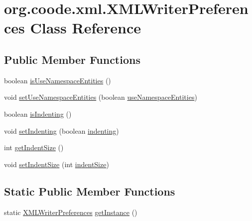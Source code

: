 \hypertarget{classorg_1_1coode_1_1xml_1_1_x_m_l_writer_preferences}{\section{org.\-coode.\-xml.\-X\-M\-L\-Writer\-Preferences Class Reference}
\label{classorg_1_1coode_1_1xml_1_1_x_m_l_writer_preferences}
}
\subsection*{Public Member Functions}
\begin{DoxyCompactItemize}
\item 
boolean \hyperlink{classorg_1_1coode_1_1xml_1_1_x_m_l_writer_preferences_ac7b4fc17a24e281dd51bce2bc9d66c86}{is\-Use\-Namespace\-Entities} ()
\item 
void \hyperlink{classorg_1_1coode_1_1xml_1_1_x_m_l_writer_preferences_ac24db7806ae752f46be098d730e73eb9}{set\-Use\-Namespace\-Entities} (boolean \hyperlink{classorg_1_1coode_1_1xml_1_1_x_m_l_writer_preferences_a8a87140e3e56abb5f86297dc6582be8c}{use\-Namespace\-Entities})
\item 
boolean \hyperlink{classorg_1_1coode_1_1xml_1_1_x_m_l_writer_preferences_a93c9364837b8ed2bca7fdf94d30d7b79}{is\-Indenting} ()
\item 
void \hyperlink{classorg_1_1coode_1_1xml_1_1_x_m_l_writer_preferences_a6e900dc13de1124d4ce9f76b3221dbf4}{set\-Indenting} (boolean \hyperlink{classorg_1_1coode_1_1xml_1_1_x_m_l_writer_preferences_a3502f467f3fc85005ab3ab0c6e51c529}{indenting})
\item 
int \hyperlink{classorg_1_1coode_1_1xml_1_1_x_m_l_writer_preferences_a8775e3aab4a472761446e20ffceb1a7e}{get\-Indent\-Size} ()
\item 
void \hyperlink{classorg_1_1coode_1_1xml_1_1_x_m_l_writer_preferences_a38a476f54700852c1916c8fbca5102e9}{set\-Indent\-Size} (int \hyperlink{classorg_1_1coode_1_1xml_1_1_x_m_l_writer_preferences_ab2c39d4bf104b8095decfc3d812b2cee}{indent\-Size})
\end{DoxyCompactItemize}
\subsection*{Static Public Member Functions}
\begin{DoxyCompactItemize}
\item 
static \hyperlink{classorg_1_1coode_1_1xml_1_1_x_m_l_writer_preferences}{X\-M\-L\-Writer\-Preferences} \hyperlink{classorg_1_1coode_1_1xml_1_1_x_m_l_writer_preferences_a5311ac502d344d1b7ce10842de9c9947}{get\-Instance} ()
\end{DoxyCompactItemize}
